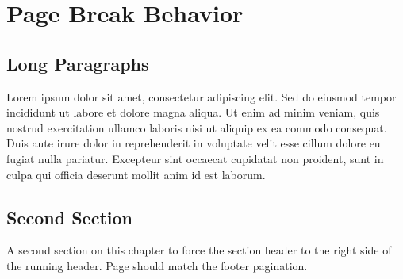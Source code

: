 \documentclass[11pt,letterpaper,openany]{book}
\begin{document}
\chapter{Page Break Behavior}
\section{Long Paragraphs}
Lorem ipsum dolor sit amet, consectetur adipiscing elit. Sed do eiusmod
tempor incididunt ut labore et dolore magna aliqua. Ut enim ad minim
veniam, quis nostrud exercitation ullamco laboris nisi ut aliquip ex ea
commodo consequat. Duis aute irure dolor in reprehenderit in voluptate
velit esse cillum dolore eu fugiat nulla pariatur. Excepteur sint
occaecat cupidatat non proident, sunt in culpa qui officia deserunt
mollit anim id est laborum.

\section{Second Section}
A second section on this chapter to force the section header to the
right side of the running header. Page \pageref{LastPage} should match
the footer pagination.
\end{document}
